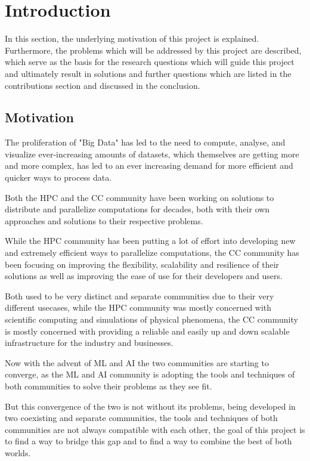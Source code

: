 \chapter{Introduction}
\label{Introduction}

In this section, the underlying motivation of this project is explained.
Furthermore, the problems which will be addressed by this project are described,
which serve as the basis for the research questions which will guide this project and ultimately
result in solutions and further questions which are listed in the contributions section and discussed in the conclusion.

\section{Motivation}

The proliferation of "Big Data" has led to the need to compute, analyse, and visualize ever-increasing amounts of datasets,
which themselves are getting more and more complex, has led to an ever increasing demand for more efficient and quicker ways to process data.

Both the \ac{HPC} and the \ac{CC} community have been working on solutions to distribute and parallelize computations for decades, 
both with their own approaches and solutions to their respective problems.

While the \ac{HPC} community has been putting a lot of effort into developing new and extremely efficient ways to parallelize computations,
the \ac{CC} community has been focusing on improving the flexibility, scalability and resilience of their solutions as well as improving the ease of use for their developers and users. 

Both used to be very distinct and separate communities due to their very different usecases, while the \ac{HPC} community was mostly concerned with scientific computing and simulations of physical phenomena,
the \ac{CC} community is mostly concerned with providing a reliable and easily up and down scalable infrastructure for the industry and businesses.

Now with the advent of \ac{ML} and \ac{AI} the two communities are starting to converge, 
as the \ac{ML} and \ac{AI} community is adopting the tools and techniques of both communities to solve their problems as they see fit.

But this convergence of the two is not without its problems, being developed in two coexisting and separate communities, the tools and techniques of both communities are not always compatible with each other,
the goal of this project is to find a way to bridge this gap and to find a way to combine the best of both worlds.

